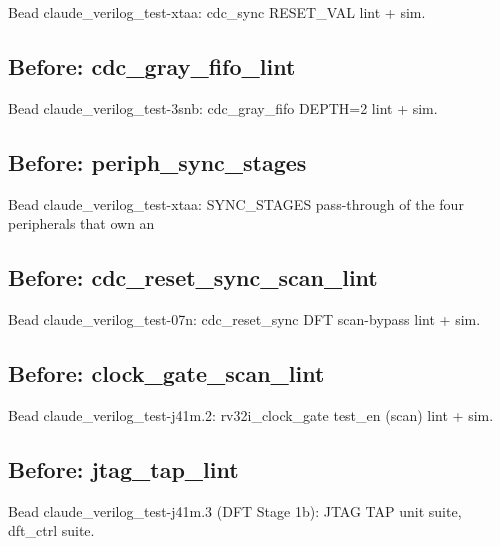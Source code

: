 \begin{record}
\begin{textblock}
Bead claude_verilog_test-xtaa: cdc_sync RESET_VAL lint + sim.
\end{textblock}

\subsection*{Before: cdc\_gray\_fifo\_lint}

\begin{textblock}
Bead claude_verilog_test-3snb: cdc_gray_fifo DEPTH=2 lint + sim.
\end{textblock}

\subsection*{Before: periph\_sync\_stages}

\begin{textblock}
Bead claude_verilog_test-xtaa: SYNC_STAGES pass-through of the four peripherals that own an
\end{textblock}

\subsection*{Before: cdc\_reset\_sync\_scan\_lint}

\begin{textblock}
Bead claude_verilog_test-07n: cdc_reset_sync DFT scan-bypass lint + sim.
\end{textblock}

\subsection*{Before: clock\_gate\_scan\_lint}

\begin{textblock}
Bead claude_verilog_test-j41m.2: rv32i_clock_gate test_en (scan) lint + sim.
\end{textblock}

\subsection*{Before: jtag\_tap\_lint}

\begin{textblock}
Bead claude_verilog_test-j41m.3 (DFT Stage 1b): JTAG TAP unit suite, dft_ctrl suite.
\end{textblock}


\end{record}
